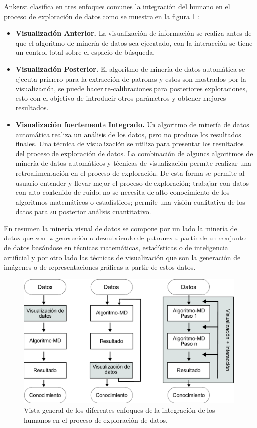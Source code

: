 Ankerst \cite{ankerst2001visual} clasifica en tres enfoques comunes la integración del humano en el proceso de exploración de datos como se muestra en la figura \ref{fig:VDM} :
\begin{itemize}
	\item \textbf{Visualización Anterior.} La visualización de información se realiza antes de que el algoritmo de minería de datos sea ejecutado, con la interacción se tiene un control total sobre el espacio de búsqueda. 
	\item \textbf{Visualización Posterior.} El algoritmo de minería de datos automática se ejecuta primero para la extracción de patrones y estos son mostrados por la visualización, se puede hacer re-calibraciones para posteriores exploraciones, esto con el objetivo de introducir otros parámetros y obtener mejores resultados.
	\item \textbf{Visualización fuertemente Integrado.} Un algoritmo de minería de datos automática realiza un análisis de los datos, pero no produce los resultados finales. Una técnica de visualización se utiliza para presentar los resultados  del proceso de exploración de datos. La combinación de algunos algoritmos de minería de datos automáticos y técnicas de visualización permite  realizar una retroalimentación en el proceso de exploración. De esta forma se permite al usuario entender y llevar mejor el proceso de exploración; trabajar con datos con alto contenido de ruido; no se necesita de alto conocimiento de los algoritmos matemáticos o estadísticos; permite una visión cualitativa de los datos para su posterior análisis cuantitativo.
\end{itemize}

En resumen la minería visual de datos se compone por un lado la minería de datos que son la generación o descubriendo de patrones a partir de un conjunto de datos basándose en técnicas matemáticas, estadísticas o de inteligencia artificial y por otro lado las técnicas de visualización que son la generación de imágenes o de representaciones gráficas a partir de estos datos.
\begin{figure}[!h]
\centering
\includegraphics[width=\columnwidth]{figs/VDM}%
\caption{Vista general de los diferentes enfoques de la integración de los humanos en el proceso de exploración de datos.}%
\label{fig:VDM}%
\end{figure}

